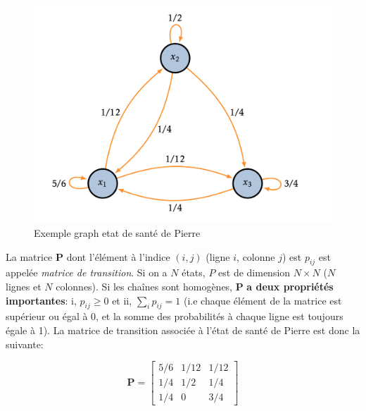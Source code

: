 \begin{figure}[h!]
    \centering
    \includegraphics[width=.7\textwidth]{graph_markov_example.png}
    \caption{Exemple graph etat de santé de Pierre}
    \label{fig:graph_markov_exemple}
\end{figure}

La matrice $\mathbf{P}$ dont l'élément à l'indice $(i,j)$ (ligne $i$, colonne $j$) est $p_{ij}$ est appelée \textit{matrice de transition}. Si on a $N$ états, $P$ est de dimension $N \times N$ ($N$ lignes et $N$ colonnes). Si les chaînes sont homogènes, $\mathbf{P}$ \textbf{a deux propriétés importantes}: i, $p_{ij} \geq 0$ et ii, $\sum_i p_{ij} = 1$ (i.e chaque élément de la matrice est supérieur ou égal à 0, et la somme des probabilités à chaque ligne est toujours égale à 1). La matrice de transition associée à l'état de santé de Pierre est donc la suivante:

\[ 
\mathbf{P} =
\begin{bmatrix}
5/6 & 1/12 & 1/12 \\
1/4 & 1/2 & 1/4 \\
1/4 & 0 & 3/4
\end{bmatrix}
\]

\newpage

